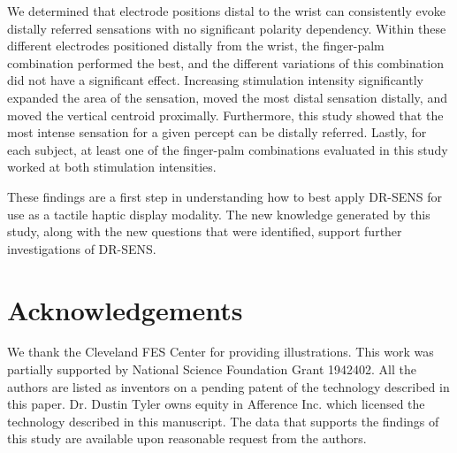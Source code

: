 \documentclass[10pt]{iopart}
\begin{document}
We determined that electrode positions distal to the wrist can consistently evoke distally referred sensations with no significant polarity dependency. Within these different electrodes positioned distally from the wrist, the finger-palm combination performed the best, and the different variations of this combination did not have a significant effect. Increasing stimulation intensity significantly expanded the area of the sensation, moved the most distal sensation distally, and moved the vertical centroid proximally. Furthermore, this study showed that the most intense sensation for a given percept can be distally referred. Lastly, for each subject, at least one of the finger-palm combinations evaluated in this study worked at both stimulation intensities. 

These findings are a first step in understanding how to best apply DR-SENS for use as a tactile haptic display modality. The new knowledge generated by this study, along with the new questions that were identified, support further investigations of DR-SENS.

\section{Acknowledgements}

We thank the Cleveland FES Center for providing illustrations. This work was partially supported by National Science Foundation Grant 1942402. All the authors are listed as inventors on a pending patent of the technology described in this paper. Dr. Dustin Tyler owns equity in Afference Inc. which licensed the technology described in this manuscript. The data that supports the findings of this study are available upon reasonable request from the authors.


{\footnotesize

}
\end{document}
